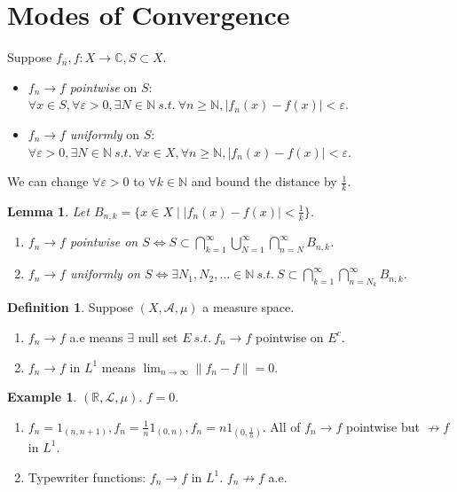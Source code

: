 \documentclass{report}
\newcommand{\R}{\mathbb{R}}
\newcommand{\C}{\mathbb{C}}
\newcommand{\N}{\mathbb{N}}
\newcommand{\st}{\ s.t.\ }
\newcommand{\cA}{\mathcal{A}}
\newcommand{\norm}[1]{\left\| #1 \right\|}
\newtheorem{lemma}[theorem]{Lemma}
\theoremstyle{definition}
\newtheorem{definition}[theorem]{Definition}
\newtheorem{example}[theorem]{Example}
\theoremstyle{remark}
\begin{document}
\section{Modes of Convergence}
Suppose $f_n, f: X \to \C, S \subset X$.
\begin{itemize}
	\item $f_n \to f$ \emph{pointwise} on $S$: $\forall x \in S, \forall \varepsilon > 0, \exists N \in \N \st \forall n \geq \N, |f_n(x) - f(x)| < \varepsilon$.
	\item $f_n \to f$ \emph{uniformly} on $S$: $\forall \varepsilon > 0, \exists N \in \N \st \forall x \in X, \forall n \geq \N, |f_n(x) - f(x)| < \varepsilon$.
\end{itemize}
We can change $\forall \varepsilon > 0$ to $\forall k \in \N$ and bound the distance by $\frac{1}{k}$.

\begin{lemma}\label{le:conv-sets}
	Let $B_{n, k} = \{x \in X \mid |f_n(x) - f(x)| < \frac{1}{k}\}$.
	\begin{enumerate}
		\item $f_n \to f$ pointwise on $\displaystyle S \iff S \subset \bigcap_{k = 1}^\infty \bigcup_{N = 1}^\infty \bigcap_{n = N}^\infty B_{n, k}$.
		\item $f_n \to f$ uniformly on $\displaystyle S \iff \exists N_1, N_2, \ldots \in \N \st S \subset \bigcap_{k = 1}^\infty \bigcap_{n = N_k}^\infty B_{n, k}$.
	\end{enumerate}
\end{lemma}
\begin{definition}
	Suppose $(X, \cA, \mu)$ a measure space.
	\begin{enumerate}
		\item $f_n \to f$ a.e means $\exists$ null set $E \st f_n \to f$ pointwise on $E^c$.
		\item $f_n \to f$ in $L^1$ means $\displaystyle \lim_{n \to \infty} \norm{f_n - f} = 0$.
	\end{enumerate}
\end{definition}

\begin{example} $(\R, \mathcal{L}, \mu)$. $f = 0$.
	\begin{enumerate}
		\item $f_n = 1_{(n, n+1)}, f_n = \frac{1}{n}1_{(0, n)}, f_n = n1_{\left(0, \frac{1}{n}\right)}$. All of $f_n \to f$ pointwise but $\not\to f$ in $L^1$.
		\item Typewriter functions: $f_n \to f$ in $L^1$. $f_n \not\to f$ a.e.
	\end{enumerate}
\end{example}
\end{document}
